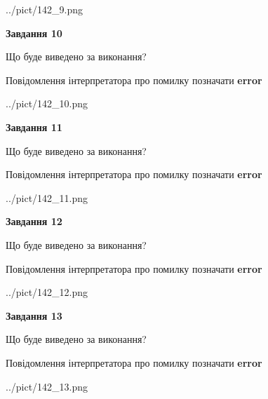 \documentclass[11pt, ukrainian]{article}
\begin{document}
{\begin {large}
\begin{center}
	{../pict/142_9.png}
\end{center}
\newpage

{\begin {center}\textbf{Завдання 10}\end {center}}\par
Що буде виведено за виконання? \par
Повідомлення інтерпретатора про помилку позначати \textbf{error}

\begin{center}
	{../pict/142_10.png}
\end{center}
\newpage

{\begin {center}\textbf{Завдання 11}\end {center}}\par
Що буде виведено за виконання? \par
Повідомлення інтерпретатора про помилку позначати \textbf{error}

\begin{center}
	{../pict/142_11.png}
\end{center}
\newpage

{\begin {center}\textbf{Завдання 12}\end {center}}\par
Що буде виведено за виконання? \par
Повідомлення інтерпретатора про помилку позначати \textbf{error}

\begin{center}
	{../pict/142_12.png}
\end{center}
\newpage

{\begin {center}\textbf{Завдання 13}\end {center}}\par
Що буде виведено за виконання? \par
Повідомлення інтерпретатора про помилку позначати \textbf{error}

\begin{center}
	{../pict/142_13.png}
\end{center}
\newpage


\end{large}}
\end{document}
